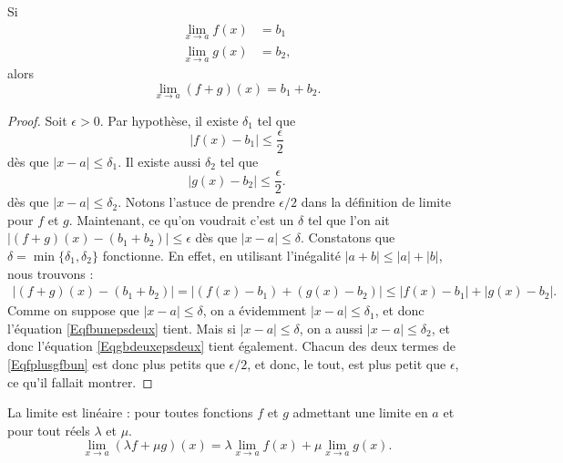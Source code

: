 \begin{theorem}     \label{ThoLimLin}
	Si
	\begin{subequations}
		\begin{align}
			\lim_{x\to a}f(x) & = b_1  \\
			\lim_{x\to a}g(x) & = b_2,
		\end{align}
	\end{subequations}
	alors
	\begin{equation}
		\lim_{x\to a}(f+g)(x)=b_1+b_2.
	\end{equation}
\end{theorem}

\begin{proof}
	Soit \( \epsilon>0\). Par hypothèse, il existe \( \delta_1\) tel que
	\begin{equation}    \label{Eqfbunepsdeux}
		| f(x)-b_1 |\leq \frac{ \epsilon }{ 2 }
	\end{equation}
	dès que \( | x-a |\leq\delta_1\). Il existe aussi \( \delta_2\) tel que
	\begin{equation}    \label{Eqgbdeuxepsdeux}
		| g(x)-b_2 |\leq \frac{ \epsilon }{ 2 }.
	\end{equation}
	dès que \( | x-a |\leq \delta_2\). Notons l'astuce de prendre \( \epsilon/2\) dans la définition de limite pour \( f\) et \( g\). Maintenant, ce qu'on voudrait c'est un \( \delta\) tel que l'on ait \( | (f+g)(x)-(b_1+b_2) |\leq \epsilon\) dès que \( | x-a |\leq \delta\). Constatons que \( \delta=\min\{ \delta_1,\delta_2 \}\) fonctionne. En effet, en utilisant l'inégalité \( | a+b |\leq | a |+| b |\), nous trouvons :
	\begin{align}
		| (f+g)(x)-(b_1+b_2) |=| (f(x)-b_1)+(g(x)-b_2) |
		\leq | f(x)-b_1 |+| g(x)-b_2 |.     \label{Eqfplusgfbun}
	\end{align}
	Comme on suppose que \( | x-a |\leq\delta\), on a évidemment \( | x-a |\leq\delta_1\), et donc l'équation \eqref{Eqfbunepsdeux} tient. Mais si \( | x-a |\leq\delta\), on a aussi \( | x-a |\leq\delta_2\), et donc l'équation  \eqref{Eqgbdeuxepsdeux} tient également. Chacun des deux termes de \eqref{Eqfplusgfbun} est donc plus petits que \( \epsilon/2\), et donc, le tout, est plus petit que \( \epsilon\), ce qu'il fallait montrer.
\end{proof}

\begin{proposition}     \label{PROPooVLBWooVttvFK}
	La limite est linéaire : pour toutes fonctions \( f\) et \( g\) admettant une limite en \( a\) et pour tout réels \( \lambda\) et \( \mu\).
	\begin{equation}
		\lim_{x\to a} (\lambda f+\mu g)(x)=\lambda\lim_{x\to a} f(x)+\mu\lim_{x\to a} g(x).
	\end{equation}
\end{proposition}

